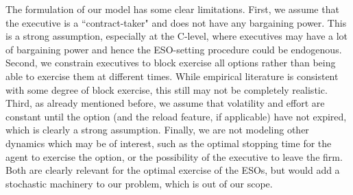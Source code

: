 The formulation of our model has some clear limitations. First, we assume that the executive is a ``contract-taker" and does not have any bargaining power. This is a strong assumption, especially at the C-level, where executives may have a lot of bargaining power and hence the ESO-setting procedure could be endogenous. Second, we constrain executives to block exercise all options rather than being able to exercise them at different times. While empirical literature is consistent with some degree of block exercise, %
this still may not be completely realistic. Third, as already mentioned before, we assume that volatility and effort are constant until the option (and the reload feature, if applicable) have not expired, which is clearly a strong assumption. Finally, we are not modeling other dynamics which may be of interest, such as the optimal stopping time for the agent to exercise the option, or the possibility of the executive to leave the firm. Both are clearly relevant for the optimal exercise of the ESOs, but would add a stochastic machinery to our problem, which is out of our scope. 




